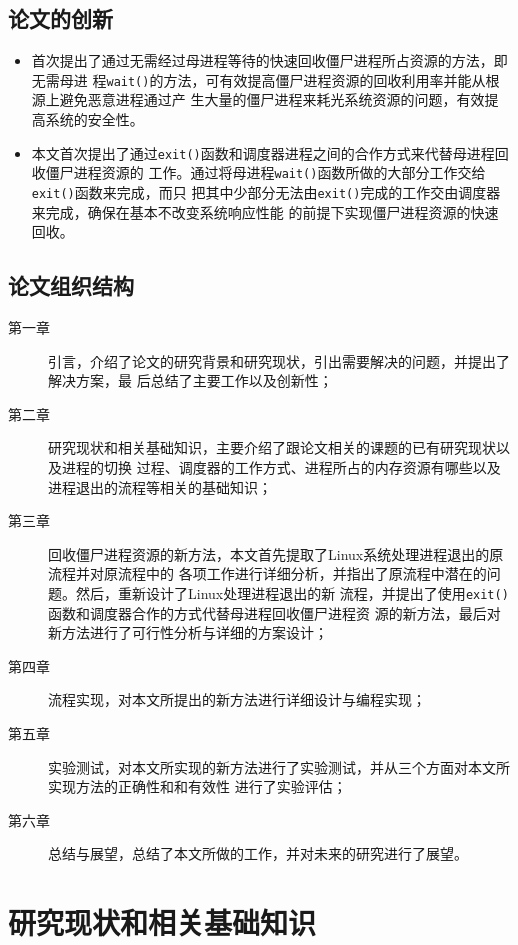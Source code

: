 \documentclass{swfuthesism}
\begin{document}
\section{论文的创新}

\begin{itemize}
\item 首次提出了通过无需经过母进程等待的快速回收僵尸进程所占资源的方法，即无需母进
  程\texttt{wait()}的方法，可有效提高僵尸进程资源的回收利用率并能从根源上避免恶意进程通过产
  生大量的僵尸进程来耗光系统资源的问题，有效提高系统的安全性。
\item 本文首次提出了通过\texttt{exit()}函数和调度器进程之间的合作方式来代替母进程回收僵尸进程资源的
  工作。通过将母进程\texttt{wait()}函数所做的大部分工作交给\texttt{exit()}函数来完成，而只
  把其中少部分无法由\texttt{exit()}完成的工作交由调度器来完成，确保在基本不改变系统响应性能
  的前提下实现僵尸进程资源的快速回收。

\end{itemize}

\section{论文组织结构}

\begin{description}
\item[第一章] 引言，介绍了论文的研究背景和研究现状，引出需要解决的问题，并提出了解决方案，最
  后总结了主要工作以及创新性；
\item[第二章] 研究现状和相关基础知识，主要介绍了跟论文相关的课题的已有研究现状以及进程的切换
  过程、调度器的工作方式、进程所占的内存资源有哪些以及进程退出的流程等相关的基础知识；
\item[第三章] 回收僵尸进程资源的新方法，本文首先提取了Linux系统处理进程退出的原流程并对原流程中的
  各项工作进行详细分析，并指出了原流程中潜在的问题。然后，重新设计了Linux处理进程退出的新
  流程，并提出了使用\texttt{exit()}函数和调度器合作的方式代替母进程回收僵尸进程资 
  源的新方法，最后对新方法进行了可行性分析与详细的方案设计；
\item[第四章] 流程实现，对本文所提出的新方法进行详细设计与编程实现；
\item[第五章] 实验测试，对本文所实现的新方法进行了实验测试，并从三个方面对本文所实现方法的正确性和和有效性
  进行了实验评估；
\item[第六章] 总结与展望，总结了本文所做的工作，并对未来的研究进行了展望。
\end{description}

\chapter{研究现状和相关基础知识}
\end{document}
